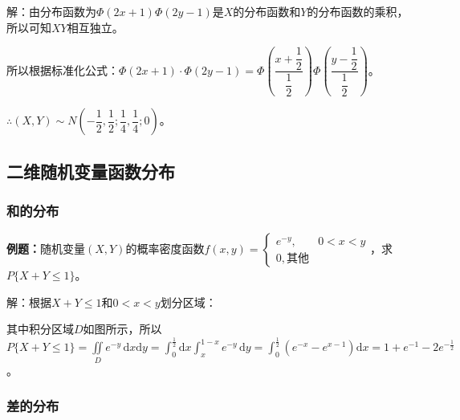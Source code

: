 \documentclass[UTF8, 12pt]{ctexart}
\begin{document}
解：由分布函数为$\varPhi(2x+1)\varPhi(2y-1)$是$X$的分布函数和$Y$的分布函数的乘积，所以可知$XY$相互独立。

所以根据标准化公式：$\varPhi(2x+1)\cdot\varPhi(2y-1)=\varPhi\left(\dfrac{x+\dfrac{1}{2}}{\dfrac{1}{2}}\right)\varPhi\left(\dfrac{y-\dfrac{1}{2}}{\dfrac{1}{2}}\right)$。

$\therefore(X,Y)\sim N\left(-\dfrac{1}{2},\dfrac{1}{2};\dfrac{1}{4},\dfrac{1}{4};0\right)$。

\subsection{二维随机变量函数分布}

\subsubsection{和的分布}

\textbf{例题：}随机变量$(X,Y)$的概率密度函数$f(x,y)=\left\{\begin{array}{ll}
    e^{-y}, & 0<x<y \\
    0, \text{其他}
\end{array}\right.$，求$P\{X+Y\leqslant1\}$。

解：根据$X+Y\leqslant1$和$0<x<y$划分区域：

\begin{multicols}{2}
    

    其中积分区域$D$如图所示，所以$P\{X+Y\leqslant1\}=\iint\limits_De^{-y}\,\textrm{d}x\textrm{d}y=\int_0^{\frac{1}{2}}\textrm{d}x\int_x^{1-x}e^{-y}\,\textrm{d}y=\int_0^{\frac{1}{2}}(e^{-x}-e^{x-1})\textrm{d}x=1+e^{-1}-2e^{-\frac{1}{2}}$。

\end{multicols}

\subsubsection{差的分布}
\end{document}
